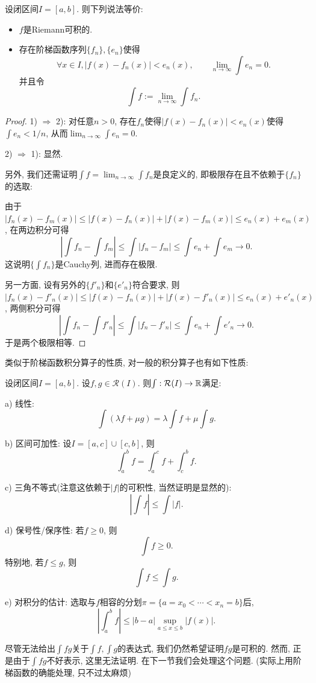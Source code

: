\begin{proposition}{} \label{pro:jptihjuudgjxdkyi}
	设闭区间$I=[a,b]$. 则下列说法等价: 
	\begin{itemize}
		\item $f$是Riemann可积的. 
		\item 存在阶梯函数序列$\{ f_n \},\{ e_n \}$使得$$\forall x \in I,|f(x)-f_n(x)|<e_n(x),\qquad \lim_{n\to \infty} \int e_n = 0.$$
		并且令$$\int f := \lim_{n\to \infty} \int f_n .$$
	\end{itemize}
\end{proposition}
\begin{proof}
	1) $\Rightarrow$ 2): 对任意$n>0$, 存在$f_n$使得$|f(x)-f_n(x)|<e_n(x)$使得$\int e_n < 1/n$, 从而$\lim_{n\to \infty} \int e_n = 0$. 

	2) $\Rightarrow$ 1): 显然. 

	另外, 我们还需证明$\int f = \lim_{n\to \infty} \int f_n$是良定义的, 即极限存在且不依赖于$\{ f_n \}$的选取: 

	由于$|f_n(x)-f_m(x)| \leq |f(x)-f_n(x)| + |f(x)-f_m(x)| \leq e_n(x)+e_m(x)$, 在两边积分可得$$\left| \int f_n-\int f_m \right| \leq \int |f_n-f_m| \leq \int e_n + \int e_m \to 0.$$
	这说明$\{ \int f_n \}$是Cauchy列, 进而存在极限. 

	另一方面, 设有另外的$\{ f'_n \}$和$\{ e'_n \}$符合要求, 则$|f_n(x)-f'_n(x)| \leq |f(x)-f_n(x)| + |f(x)-f'_n(x)| \leq e_n(x)+e'_n(x)$, 两侧积分可得$$\left| \int f_n - \int f'_n \right| \leq \int |f_n-f'_n| \leq \int e_n+ \int e'_n \to 0.$$
	于是两个极限相等. 
\end{proof}


类似于阶梯函数积分算子的性质, 对一般的积分算子也有如下性质: 

\begin{proposition}{} \label{pro:jiffxkvi1}
	设闭区间$I=[a,b]$. 设$f,g \in \mathcal{R}(I)$. 则$\int : \mathcal{R}(I) \to \mathbb{R}$满足: 
	
	a) 线性: $$\int (\lambda f+ \mu g) = \lambda \int f + \mu \int g.$$
	
	b) 区间可加性: 设$I=[a,c] \cup [c,b]$, 则$$\int_a^b f = \int_a^c f + \int_c^b f. $$
	
	c) 三角不等式(注意这依赖于$|f|$的可积性, 当然证明是显然的): $$\left| \int f \right| \leq \int |f|. $$
	
	d) 保号性/保序性: 若$f \geq 0$, 则$$\int f \geq 0. $$
	\qquad 特别地, 若$f \leq g$, 则$$ \int f \leq  \int g.$$
	
	e) 对积分的估计: 选取与$f$相容的分划$\pi= \{ a=x_0<\cdots <x_n=b \}$后, $$\left| \int_a^b f \right| \leq |b-a| \sup_{a \leq x \leq b} |f(x)|. $$
\end{proposition}
\begin{remark}
	尽管无法给出$\int fg$关于$\int f,\int g$的表达式, 我们仍然希望证明$fg$是可积的. 然而, 正是由于$\int fg$不好表示, 这里无法证明. 在下一节我们会处理这个问题. (实际上用阶梯函数的确能处理, 只不过太麻烦)
\end{remark}

